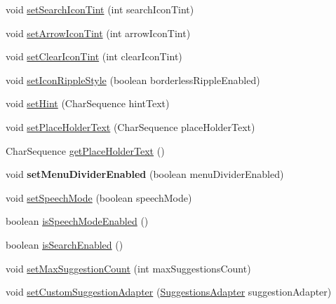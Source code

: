 \begin{DoxyCompactItemize}
\item 
void \mbox{\hyperlink{classcom_1_1example_1_1searchwidget_1_1_search_bar_adca3a2ec79965621b5d77a52ecc68c5b}{set\+Search\+Icon\+Tint}} (int search\+Icon\+Tint)
\item 
void \mbox{\hyperlink{classcom_1_1example_1_1searchwidget_1_1_search_bar_aaf5917642f41df0d4836a7ebe1f5205b}{set\+Arrow\+Icon\+Tint}} (int arrow\+Icon\+Tint)
\item 
void \mbox{\hyperlink{classcom_1_1example_1_1searchwidget_1_1_search_bar_aed6f9a5ee6a225ee697304e6a3ed5d5d}{set\+Clear\+Icon\+Tint}} (int clear\+Icon\+Tint)
\item 
void \mbox{\hyperlink{classcom_1_1example_1_1searchwidget_1_1_search_bar_a2b5871caacebd12411dbc3bdf3d7c5a1}{set\+Icon\+Ripple\+Style}} (boolean borderless\+Ripple\+Enabled)
\item 
void \mbox{\hyperlink{classcom_1_1example_1_1searchwidget_1_1_search_bar_a0f7d73658027bd472ea96b299249f48b}{set\+Hint}} (Char\+Sequence hint\+Text)
\item 
void \mbox{\hyperlink{classcom_1_1example_1_1searchwidget_1_1_search_bar_a27d40730d4d6a78b9ee89a8c33120d13}{set\+Place\+Holder\+Text}} (Char\+Sequence place\+Holder\+Text)
\item 
Char\+Sequence \mbox{\hyperlink{classcom_1_1example_1_1searchwidget_1_1_search_bar_a97ca29bf8c1fe951bec0dee054187108}{get\+Place\+Holder\+Text}} ()
\item 
\mbox{\label{classcom_1_1example_1_1searchwidget_1_1_search_bar_a0da1cdfc1b6d647721c7f0daa34c7bd7}} 
void {\bfseries set\+Menu\+Divider\+Enabled} (boolean menu\+Divider\+Enabled)
\item 
void \mbox{\hyperlink{classcom_1_1example_1_1searchwidget_1_1_search_bar_abcb40436e4d424c4f5ac721d5f507412}{set\+Speech\+Mode}} (boolean speech\+Mode)
\item 
boolean \mbox{\hyperlink{classcom_1_1example_1_1searchwidget_1_1_search_bar_a1bf37ff1703370a852d5573dfffe5daf}{is\+Speech\+Mode\+Enabled}} ()
\item 
boolean \mbox{\hyperlink{classcom_1_1example_1_1searchwidget_1_1_search_bar_a101525ef181280109b31396c3175c91c}{is\+Search\+Enabled}} ()
\item 
void \mbox{\hyperlink{classcom_1_1example_1_1searchwidget_1_1_search_bar_a0f4236bdaf89946d9bdc0eb982cb7cce}{set\+Max\+Suggestion\+Count}} (int max\+Suggestions\+Count)
\item 
void \mbox{\hyperlink{classcom_1_1example_1_1searchwidget_1_1_search_bar_ac3d6b348b32c8129fca764c3cfe9b810}{set\+Custom\+Suggestion\+Adapter}} (\mbox{\hyperlink{classcom_1_1example_1_1searchwidget_1_1adapter_1_1_suggestions_adapter}{Suggestions\+Adapter}} suggestion\+Adapter)

\end{DoxyCompactItemize}

